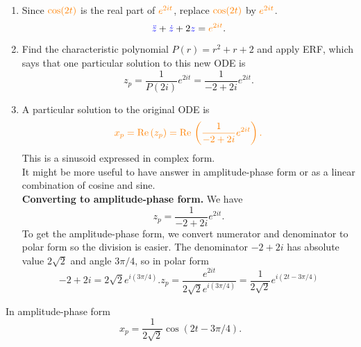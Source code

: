 \Solution
\begin{enumerate}
\item Since ${\color{orange}{\cos (2t)}}$ is the real part of ${\color{orange}{e^{2it}}}$, 
  replace ${\color{orange}{\cos (2t)}}$ by ${\color{orange}{e^{2it}}}$.
  \begin{equation*}
    {\color{blue}{\ddot{z}}}  + {\color{blue}{\dot{z}}}  + 2{\color{blue}{z}}
    = {\color{orange}{e^{2it}}} .
  \end{equation*}
\item Find the characteristic polynomial $P(r) = r^2 + r + 2$ and apply ERF,
  which says that one particular solution to this new ODE is
  \begin{equation*}
    \displaystyle z_ p
    \displaystyle = \frac{1}{P(2i)} e^{2it}
    \displaystyle = \frac{1}{-2 + 2i} e^{2it}. 
  \end{equation*}
\item A particular solution to the original ODE is
  \begin{equation*}
    {\color{orange}{x_ p = \mathrm{Re\, }(z_ p)
        = \mathrm{Re\, }\left( \frac{1}{-2+2i} e^{2it} \right).}}
  \end{equation*}
  This is a sinusoid expressed in complex form. \\
  It might be more useful to have answer in amplitude-phase form or
  as a linear combination of cosine and sine. \\

  \textbf{\color{blue} Converting to amplitude-phase form.} We have
  \begin{equation*}
    \displaystyle z_ p
    \displaystyle = \frac{1}{-2 + 2i} e^{2it}. 
  \end{equation*}
  To get the amplitude-phase form, we convert numerator and denominator to
  polar form so the division is easier. The denominator $-2 + 2i$ has absolute value
  $2 \sqrt{2}$ and angle $3 \pi / 4$, so in polar form
  \begin{equation*}
    \displaystyle -2 + 2i
    \displaystyle = 2 \sqrt{2} e^{i (3 \pi / 4)}. z_ p
    \displaystyle = \frac{e^{2it}}{2 \sqrt{2} e^{i (3 \pi / 4)}}
    \displaystyle = \frac{1}{2 \sqrt{2}} e^{i(2t - 3 \pi / 4)}
  \end{equation*}
\end{enumerate}
\Conclusion In amplitude-phase form
\begin{equation*}
  \boxed {x_ p = \frac{1}{2\sqrt {2}} \cos (2t - 3\pi /4). }
\end{equation*}

